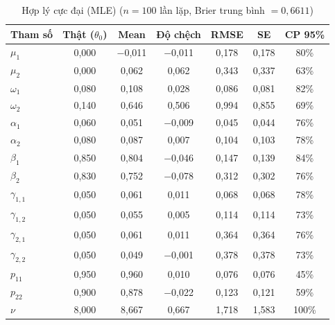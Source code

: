 \documentclass[11pt,a4paper]{article}
\begin{document}
\begin{table}[H]\centering\footnotesize
\caption{Hợp lý cực đại (MLE) ($n=100$ lần lặp, Brier trung bình $=0,6611$)}
\begin{tabularx}{\textwidth}{l C C C C C C}
\toprule
\textbf{Tham số} & \textbf{Thật ($\theta_0$)} & \textbf{Mean} & \textbf{Độ chệch} & \textbf{RMSE} & \textbf{SE} & \textbf{CP 95\%} \\
\midrule
$\mu_1$ & 0,000 & $-$0,011 & $-$0,011 & 0,178 & 0,178 & 80\% \\
$\mu_2$ & 0,000 & 0,062 & 0,062 & 0,343 & 0,337 & 63\% \\
$\omega_1$ & 0,080 & 0,108 & 0,028 & 0,086 & 0,081 & 82\% \\
$\omega_2$ & 0,140 & 0,646 & 0,506 & 0,994 & 0,855 & 69\% \\
$\alpha_1$ & 0,060 & 0,051 & $-$0,009 & 0,045 & 0,044 & 76\% \\
$\alpha_2$ & 0,080 & 0,087 & 0,007 & 0,104 & 0,103 & 78\% \\
$\beta_1$ & 0,850 & 0,804 & $-$0,046 & 0,147 & 0,139 & 84\% \\
$\beta_2$ & 0,830 & 0,752 & $-$0,078 & 0,312 & 0,302 & 76\% \\
$\gamma_{1,1}$ & 0,050 & 0,061 & 0,011 & 0,068 & 0,068 & 78\% \\
$\gamma_{1,2}$ & 0,050 & 0,055 & 0,005 & 0,114 & 0,114 & 73\% \\
$\gamma_{2,1}$ & 0,050 & 0,061 & 0,011 & 0,364 & 0,364 & 76\% \\
$\gamma_{2,2}$ & 0,050 & 0,049 & $-$0,001 & 0,378 & 0,378 & 73\% \\
$p_{11}$ & 0,950 & 0,960 & 0,010 & 0,076 & 0,076 & 45\% \\
$p_{22}$ & 0,900 & 0,878 & $-$0,022 & 0,123 & 0,121 & 59\% \\
$\nu$ & 8,000 & 8,667 & 0,667 & 1,718 & 1,583 & 100\% \\
\bottomrule
\end{tabularx}
\end{table}
\end{document}
